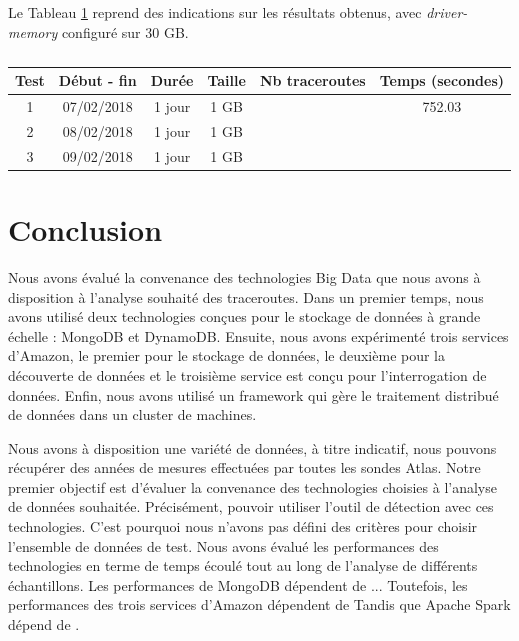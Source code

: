  Le Tableau 	\ref{tab:spark-timing-reajustedcode} reprend des indications sur les résultats obtenus, avec \textit{driver-memory} configuré sur  $ 30 $ GB. 

\begin{table}[H]
	\centering
	\captionsetup{justification=centering}
	\begin{tabular}{cccccc}
		\textbf{Test} & \textbf{Début - fin} &\textbf{Durée}  & \textbf{Taille}  & \textbf{Nb traceroutes} & \textbf{Temps (secondes)} \\ \hline
		
	1&	07/02/2018&1 jour&1 GB&& 752.03\\ \hline
	2&	08/02/2018&1 jour&1 GB&&  \\ \hline
	3&	09/02/2018&1 jour& 1 GB&&  \\ \hline
	\end{tabular}
	\caption{}
	\label{tab:spark-timing-reajustedcode}
\end{table}


 


\section{Conclusion}

Nous avons évalué la convenance des technologies Big Data  que nous avons à disposition à l'analyse souhaité des traceroutes. Dans un premier temps, nous avons utilisé deux technologies conçues pour le stockage de données à grande échelle : MongoDB et DynamoDB. Ensuite, nous avons expérimenté trois services d'Amazon, le premier pour le stockage de données, le deuxième  pour la découverte de données et le troisième service  est conçu pour l'interrogation  de données. Enfin, nous avons utilisé un framework qui gère le traitement distribué de données dans un cluster de machines.

Nous avons à disposition une variété de données,   à titre indicatif, nous pouvons récupérer des années  de mesures effectuées par toutes les sondes Atlas. Notre premier objectif  est d'évaluer la convenance des technologies choisies à l'analyse de données souhaitée. Précisément, pouvoir utiliser l'outil de détection avec ces technologies. C'est pourquoi nous n'avons pas défini des critères pour choisir l'ensemble de données de test. 
Nous avons évalué  les performances des technologies en terme de temps écoulé tout au long de l'analyse de différents échantillons.
Les performances de MongoDB dépendent de ... 
Toutefois, les performances des trois services d'Amazon dépendent de 
Tandis que Apache Spark dépend de .


